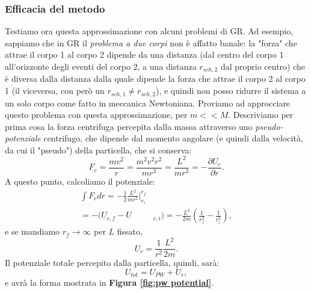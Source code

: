\subsubsection{Efficacia del metodo}
Testiamo ora questa approssimazione con alcuni problemi di GR.
Ad esempio, sappiamo che in GR il \textit{problema a due corpi} non è affatto banale: 
la "forza" che attrae il corpo 1 al corpo 2 dipende da una distanza (dal centro del corpo 1 all'orizzonte degli eventi del corpo 2, a una distanza $r_{sch,2}$ dal proprio centro) che è diversa dalla distanza dalla quale dipende la forza che attrae il corpo 2 al corpo 1 (il viceversa, con però un $r_{sch,1} \not= r_{sch,2}$), e quindi non posso ridurre il sistema a un solo corpo come fatto in meccanica Newtoniana.
Proviamo ad approcciare questo problema con questa approssimazione, per $m<<M$.
Descriviamo per prima cosa la forza centrifuga percepita dalla massa attraverso uno \textit{pseudo-potenziale} centrifugo, che dipende dal momento angolare (e quindi dalla velocità, da cui il "pseudo") della particella, che si conserva:
\begin{equation}
    F_c=\frac{mv^2}{r}=\frac{m^2v^2r^2}{mr^3} = \frac{L^2}{mr^3} = -\frac{\partial U_c}{\partial r}.
\end{equation}
A questo punto, calcoliamo il potenziale:
\begin{align}
    \int F_c dr = -\frac{1}{2}\frac{L^2}{mr^2}{\Big|}_{r_i}^{r_f}\\ 
    = -(U_{c,f} - U&_{c,i}) = -\frac{L^2}{2m}\left( \frac{1}{r_f^2} - \frac{1}{r_i^2} \right), 
\end{align}
e se mandiamo $r_f\xrightarrow{} \infty$ per $L$ fissato,
\begin{equation}
    U_c = \frac{1}{r^2}\frac{L^2}{2m}.
\end{equation}
Il potenziale totale percepito dalla particella, quindi, sarà:
\begin{equation}
    U_{tot} = U_{PW} + U_c,
\end{equation}
e avrà la forma mostrata in \textbf{Figura \ref{fig:pw potential}}.
